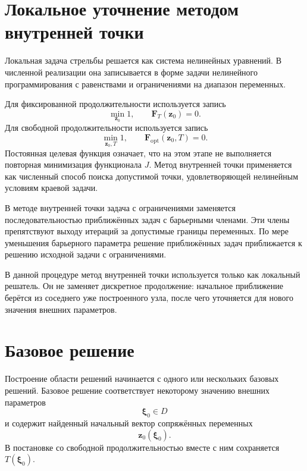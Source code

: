 \section*{Локальное уточнение методом внутренней точки}

Локальная задача стрельбы решается как система нелинейных уравнений. В численной реализации она записывается в форме задачи нелинейного программирования с равенствами и ограничениями на диапазон переменных.

Для фиксированной продолжительности используется запись
\begin{equation}
	\min_{\mathbf z_0} 1,
	\qquad
	\mathbf F_T(\mathbf z_0)=0.
\end{equation}
Для свободной продолжительности используется запись
\begin{equation}
	\min_{\mathbf z_0,T} 1,
	\qquad
	\mathbf F_{\mathrm{opt}}(\mathbf z_0,T)=0.
\end{equation}
Постоянная целевая функция означает, что на этом этапе не выполняется повторная минимизация функционала \(J\). Метод внутренней точки применяется как численный способ поиска допустимой точки, удовлетворяющей нелинейным условиям краевой задачи.

В методе внутренней точки задача с ограничениями заменяется последовательностью приближённых задач с барьерными членами. Эти члены препятствуют выходу итераций за допустимые границы переменных. По мере уменьшения барьерного параметра решение приближённых задач приближается к решению исходной задачи с ограничениями.

В данной процедуре метод внутренней точки используется только как локальный решатель. Он не заменяет дискретное продолжение: начальное приближение берётся из соседнего уже построенного узла, после чего уточняется для нового значения внешних параметров.

\section*{Базовое решение}

Построение области решений начинается с одного или нескольких базовых решений. Базовое решение соответствует некоторому значению внешних параметров
\begin{equation}
	\boldsymbol\xi_0\in D
\end{equation}
и содержит найденный начальный вектор сопряжённых переменных
\begin{equation}
	\mathbf z_0(\boldsymbol\xi_0).
\end{equation}
В постановке со свободной продолжительностью вместе с ним сохраняется \(T(\boldsymbol\xi_0)\).

